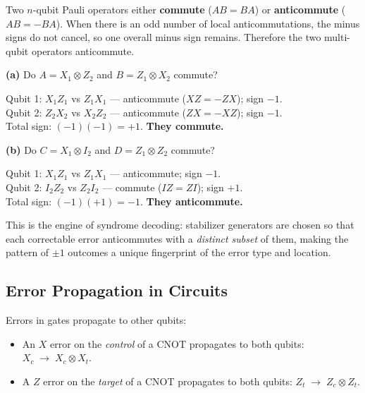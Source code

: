\documentclass[11pt, a4paper]{article}
\theoremstyle{definition}
\theoremstyle{plain}
\theoremstyle{remark}
\begin{document}
Two $n$-qubit Pauli operators either \textbf{commute} ($AB = BA$) or
\textbf{anticommute} ($AB = -BA$).  When there is an odd number of local anticommutations, 
the minus signs do not cancel, so one overall minus sign remains. Therefore the two multi-qubit operators anticommute.

\begin{workedexample}
\textbf{(a)} Do $A = X_1 \otimes Z_2$ and $B = Z_1 \otimes X_2$ commute?

Qubit 1: $X_1 Z_1$ vs $Z_1 X_1$ --- anticommute ($XZ=-ZX$); sign $-1$.\\
Qubit 2: $Z_2 X_2$ vs $X_2 Z_2$ --- anticommute ($ZX=-XZ$); sign $-1$.\\
Total sign: $(-1)(-1) = +1$.  \textbf{They commute.}

\medskip
\textbf{(b)} Do $C = X_1 \otimes I_2$ and $D = Z_1 \otimes Z_2$ commute?

Qubit 1: $X_1 Z_1$ vs $Z_1 X_1$ --- anticommute; sign $-1$.\\
Qubit 2: $I_2 Z_2$ vs $Z_2 I_2$ --- commute ($IZ = ZI$); sign $+1$.\\
Total sign: $(-1)(+1) = -1$.  \textbf{They anticommute.}
\end{workedexample}

This is the engine of syndrome decoding: stabilizer generators are chosen
so that each correctable error anticommutes with a \emph{distinct subset}
of them, making the pattern of $\pm1$ outcomes a unique fingerprint of the
error type and location.

\subsection{Error Propagation in Circuits}

Errors in gates propagate to other qubits:
\begin{itemize}
  \item An $X$ error on the \emph{control} of a CNOT propagates to both
        qubits: $X_c \;\to\; X_c \otimes X_t$.
  \item A $Z$ error on the \emph{target} of a CNOT propagates to both
        qubits: $Z_t \;\to\; Z_c \otimes Z_t$.
\end{itemize}
\end{document}
